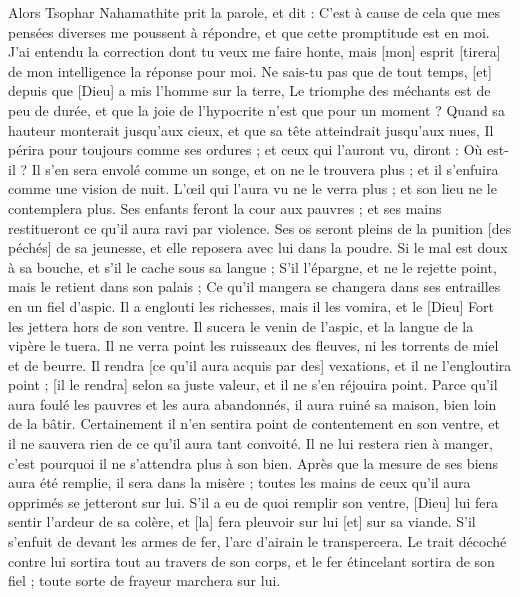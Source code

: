 \begin{multicols}{2}
\VerseOne{}Alors Tsophar Nahamathite prit la parole, et dit :
C'est à cause de cela que mes pensées diverses me poussent à répondre, et que cette promptitude est en moi.
J'ai entendu la correction dont tu veux me faire honte, mais [mon] esprit [tirera] de mon intelligence la réponse pour moi.
Ne sais-tu pas que de tout temps, [et] depuis que [Dieu] a mis l'homme sur la terre,
Le triomphe des méchants est de peu de durée, et que la joie de l'hypocrite n'est que pour un moment ?
Quand sa hauteur monterait jusqu'aux cieux, et que sa tête atteindrait jusqu'aux nues,
Il périra pour toujours comme ses ordures ; et ceux qui l'auront vu, diront : Où est-il ?
Il s'en sera envolé comme un songe, et on ne le trouvera plus ; et il s'enfuira comme une vision de nuit.
L'œil qui l'aura vu ne le verra plus ; et son lieu ne le contemplera plus.
Ses enfants feront la cour aux pauvres ; et ses mains restitueront ce qu'il aura ravi par violence.
Ses os seront pleins de la punition [des péchés] de sa jeunesse, et elle reposera avec lui dans la poudre.
Si le mal est doux à sa bouche, et s'il le cache sous sa langue ;
S'il l'épargne, et ne le rejette point, mais le retient dans son palais ;
Ce qu'il mangera se changera dans ses entrailles en un fiel d'aspic.
Il a englouti les richesses, mais il les vomira, et le [Dieu] Fort les jettera hors de son ventre.
Il sucera le venin de l'aspic, et la langue de la vipère le tuera.
Il ne verra point les ruisseaux des fleuves, ni les torrents de miel et de beurre.
Il rendra [ce qu'il aura acquis par des] vexations, et il ne l'engloutira point ; [il le rendra] selon sa juste valeur, et il ne s'en réjouira point.
Parce qu'il aura foulé les pauvres et les aura abandonnés, il aura ruiné sa maison, bien loin de la bâtir.
Certainement il n'en sentira point de contentement en son ventre, et il ne sauvera rien de ce qu'il aura tant convoité.
Il ne lui restera rien à manger, c'est pourquoi il ne s'attendra plus à son bien.
Après que la mesure de ses biens aura été remplie, il sera dans la misère ; toutes les mains de ceux qu'il aura opprimés se jetteront sur lui.
S'il a eu de quoi remplir son ventre, [Dieu] lui fera sentir l'ardeur de sa colère, et [la] fera pleuvoir sur lui [et] sur sa viande.
S'il s'enfuit de devant les armes de fer, l'arc d'airain le transpercera.
Le trait décoché contre lui sortira tout au travers de son corps, et le fer étincelant sortira de son fiel ; toute sorte de frayeur marchera sur lui.

\end{multicols}
